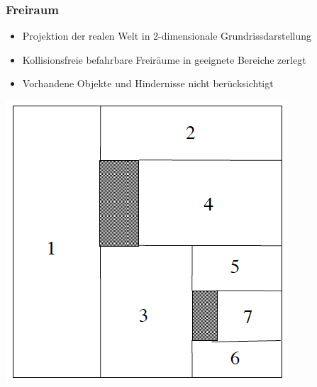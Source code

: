 \documentclass[paper=a4, fontsize=11pt]{scrartcl} %
\numberwithin{equation}{section} %
\numberwithin{figure}{section} %
\numberwithin{table}{section} %
\begin{document}
\subsubsection{Freiraum}
\begin{minipage}{0.6\textwidth}
\begin{itemize}
\item Projektion der realen Welt in 2-dimensionale Grundrissdarstellung
\item Kollisionsfreie befahrbare Freiräume in geeignete Bereiche zerlegt
\item Vorhandene Objekte und Hindernisse nicht berücksichtigt
\end{itemize}
\end{minipage}
\begin{minipage}{0.3\textwidth}
\includegraphics[width=\textwidth]{imgs/freiraum}
\end{minipage}
\end{document}
